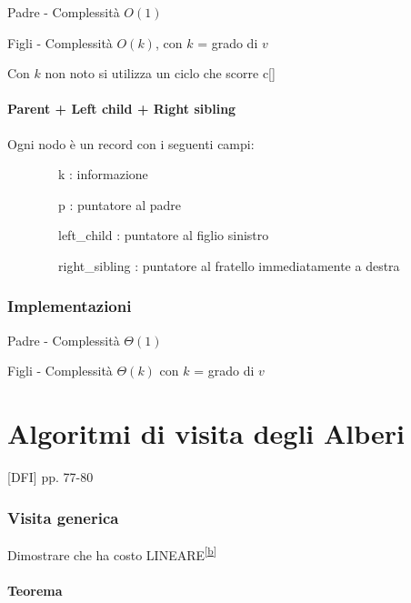 \documentclass{article}
\let\oldparagraph\paragraph
\renewcommand{\paragraph}[1]{\oldparagraph{#1}\mbox{}}
\begin{document}
{{{{{Padre - Complessità $O(1)$}



{Figli - Complessità $O(k)$, con $k$ = grado di $v$ }

{Con $k$ non noto si utilizza un ciclo che scorre c{[}{]}}



\paragraph{Parent + Left child + Right sibling}

{Ogni nodo è un record con i seguenti campi:}

{~~~~~~~~k : informazione}

{~~~~~~~~p : puntatore al padre}

{~~~~~~~~left\_child : puntatore al figlio sinistro}

{~~~~~~~~right\_sibling : puntatore al fratello immediatamente a destra}

\subsubsection{Implementazioni}

{Padre - Complessità $\Theta(1)$}



{Figli - Complessità $\Theta(k)$ con $k$ = grado di $v$}



\section{Algoritmi di visita degli Alberi}

{{[}DFI{]} pp. 77-80}

\subsubsection{Visita generica}



{Dimostrare che ha costo LINEARE}\textsuperscript{\protect\hyperlink{cmnt2}{{[}b{]}}}

\hypertarget{h.6xasx7f8zgn1}{\paragraph{\texorpdfstring{{Teorema}}{Teorema}}\label{h.6xasx7f8zgn1}}

}}}}
\end{document}
